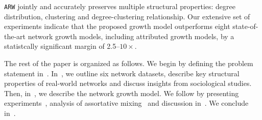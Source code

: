 \texttt{ARW} jointly and accurately preserves
multiple structural properties: degree distribution, clustering and
degree-clustering relationship.
Our extensive set of experiments indicate that the proposed growth model outperforms
eight state-of-the-art network growth models, including attributed growth models, by a
statistcally significant margin of 2.5--$10\times$.

The rest of the paper is organized as follows.
We begin by defining the problem statement in~.
In~, we outline six network datasets, describe key structural
properties of real-world networks and discuss insights from sociological studies.
Then, in~, we describe the network growth model. We follow by presenting experiments~, analysis of assortative mixing~
and discussion in~. We conclude in~.

